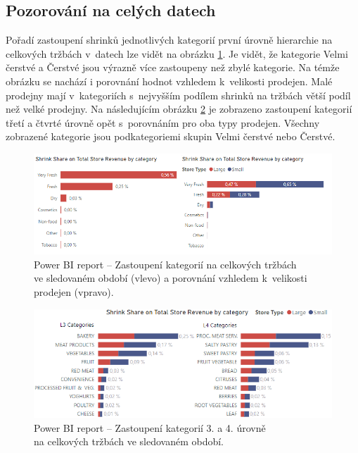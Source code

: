 \subsection*{Pozorování na celých datech}

Pořadí zastoupení shrinků jednotlivých kategorií první úrovně hierarchie na celkových tržbách v~datech lze vidět na obrázku \ref*{obr:PBI:vysL1}. Je vidět, že kategorie Velmi čerstvé a Čerstvé jsou výrazně více zastoupeny než zbylé kategorie. Na témže obrázku se nachází i porovnání hodnot vzhledem k~velikosti prodejen. 
Malé prodejny mají v~kategoriích s~nejvyšším podílem shrinků na tržbách větší podíl než velké prodejny.
Na následujícím obrázku \ref*{obr:PBI:vysL34} je zobrazeno zastoupení kategorií třetí a čtvrté úrovně opět s~porovnáním pro oba typy prodejen. Všechny zobrazené kategorie jsou podkategoriemi skupin Velmi čerstvé nebo Čerstvé.

\begin{figure}[h!]
    \centering
    \captionsetup{justification=centering}
    \includegraphics[width=\textwidth]{obrazky/PBI/vys_L1.png}
    \caption{Power BI report -- Zastoupení kategorií na celkových tržbách  \\ ve sledovaném období (vlevo) a porovnání vzhledem k~velikosti prodejen (vpravo).}
    \label{obr:PBI:vysL1}
\end{figure}

\begin{figure}[h!]
    \centering
    \captionsetup{justification=centering}
    \includegraphics[width=\textwidth]{obrazky/PBI/l3l4.png}
    \caption{Power BI report -- Zastoupení kategorií 3. a 4. úrovně \\na celkových tržbách ve sledovaném období.}
    \label{obr:PBI:vysL34}
\end{figure}


